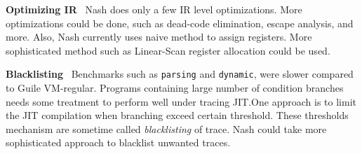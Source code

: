 \documentclass[preprint, numbers]{sigplanconf}
\begin{document}
\bigskip

\textbf{Optimizing IR} \@~\@ Nash does only a few IR level optimizations. More
optimizations could be done, such as dead-code elimination, escape analysis,
and more. Also, Nash currently uses naive method to assign registers. More
sophisticated method such as Linear-Scan register
allocation\cite{poletto1999linear} could be used.

\bigskip

\textbf{Blacklisting} \@~\@ Benchmarks such as \texttt{parsing} and
\texttt{dynamic}, were slower compared to Guile VM-regular. Programs
containing large number of condition branches needs some treatment to perform
well under tracing JIT.\@ One approach is to limit the JIT compilation when
branching exceed certain threshold. These thresholds mechanism are sometime
called \textit{blacklisting} of trace. Nash could take more sophisticated
approach to blacklist unwanted traces.







\end{document}
